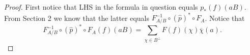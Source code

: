 \documentclass[11pt]{amsart}
\theoremstyle{definition}
\begin{document}
\begin{proof}
    First notice that LHS in the formula in question equals $p_*(f)(aB)$. From Section 2  we know that the latter equals $F_{A/B}^{-1}\circ (\hat{p})^*\circ F_A$. Notice that
    $$F_{A/B}^{-1}\circ (\hat{p})^*\circ F_A(f)(aB)=
    \sum_{\chi\in B^\perp }F(f)(\chi)\overline{\chi}(a).$$
\end{proof}
\end{document}
